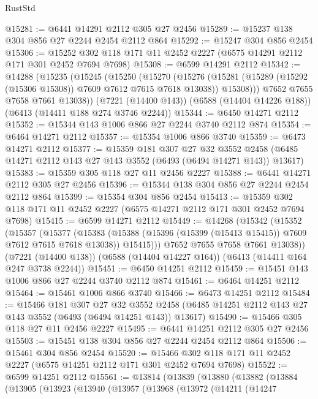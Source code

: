 \begin{lexlean}{RustStd}
\begin{coremodule}
@15281 := @6441 @14291 @2112 @305 @27 @2456
@15289 := @15237 @138 @304 @856 @27 @2244 @2454 @2112 @864
@15292 := @15247 @304 @856 @2454
@15306 := @15252 @302 @118 @171 @11 @2452 @2227 (@6575 @14291 @2112 @171 @301 @2452 @7694 @7698)
@15308 := @6599 @14291 @2112
@15342 := @14288
    (@15235
      (@15245
        (@15250
          (@15270
            (@15276
              (@15281 (@15289 (@15292 (@15306 @15308)) @7609 @7612 @7615 @7618 @13038))
              @15308)))
        @7652
        @7655
        @7658
        @7661
        @13038))
    (@7221 (@14400 @143))
    (@6588 (@14404 @14226 @188))
    (@6413 (@14411 @188 @274 @3746 @2244))
@15344 := @6450 @14271 @2112
@15352 := @15344 @143 @1006 @866 @27 @2244 @3740 @2112 @874
@15354 := @6464 @14271 @2112
@15357 := @15354 @1006 @866 @3740
@15359 := @6473 @14271 @2112
@15377 := @15359
    @181
    @307
    @27
    @32
    @3552
    @2458
    (@6485 @14271 @2112 @143 @27 @143 @3552 (@6493 (@6494 @14271 @143)) @13617)
@15383 := @15359 @305 @118 @27 @11 @2456 @2227
@15388 := @6441 @14271 @2112 @305 @27 @2456
@15396 := @15344 @138 @304 @856 @27 @2244 @2454 @2112 @864
@15399 := @15354 @304 @856 @2454
@15413 := @15359 @302 @118 @171 @11 @2452 @2227 (@6575 @14271 @2112 @171 @301 @2452 @7694 @7698)
@15415 := @6599 @14271 @2112
@15449 := @14268
    (@15342
      (@15352
        (@15357
          (@15377
            (@15383
              (@15388 (@15396 (@15399 (@15413 @15415)) @7609 @7612 @7615 @7618 @13038))
              @15415)))
        @7652
        @7655
        @7658
        @7661
        @13038))
    (@7221 (@14400 @138))
    (@6588 (@14404 @14227 @164))
    (@6413 (@14411 @164 @247 @3738 @2244))
@15451 := @6450 @14251 @2112
@15459 := @15451 @143 @1006 @866 @27 @2244 @3740 @2112 @874
@15461 := @6464 @14251 @2112
@15464 := @15461 @1006 @866 @3740
@15466 := @6473 @14251 @2112
@15484 := @15466
    @181
    @307
    @27
    @32
    @3552
    @2458
    (@6485 @14251 @2112 @143 @27 @143 @3552 (@6493 (@6494 @14251 @143)) @13617)
@15490 := @15466 @305 @118 @27 @11 @2456 @2227
@15495 := @6441 @14251 @2112 @305 @27 @2456
@15503 := @15451 @138 @304 @856 @27 @2244 @2454 @2112 @864
@15506 := @15461 @304 @856 @2454
@15520 := @15466 @302 @118 @171 @11 @2452 @2227 (@6575 @14251 @2112 @171 @301 @2452 @7694 @7698)
@15522 := @6599 @14251 @2112
@15561 := @13814
    (@13839
      (@13880
        (@13882
          (@13884
            (@13905
              (@13923
                (@13940
                  (@13957
                    (@13968
                      (@13972
                        (@14211
                          (@14247

\end{coremodule}
\end{lexlean}
